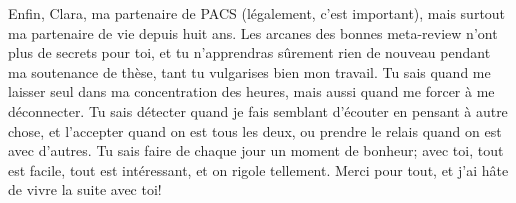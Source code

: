 Enfin, Clara, ma partenaire de PACS (légalement, c'est important), mais surtout ma partenaire de vie depuis huit ans. Les arcanes des bonnes meta-review n'ont plus de secrets pour toi, et tu n'apprendras sûrement rien de nouveau pendant ma soutenance de thèse, tant tu vulgarises bien mon travail. Tu sais quand me laisser seul dans ma concentration des heures, mais aussi quand me forcer à me déconnecter. Tu sais détecter quand je fais semblant d'écouter en pensant à autre chose, et l'accepter quand on est tous les deux, ou prendre le relais quand on est avec d'autres. Tu sais faire de chaque jour un moment de bonheur; avec toi, tout est facile, tout est intéressant, et on rigole tellement. Merci pour tout, et j'ai hâte de vivre la suite avec toi!
